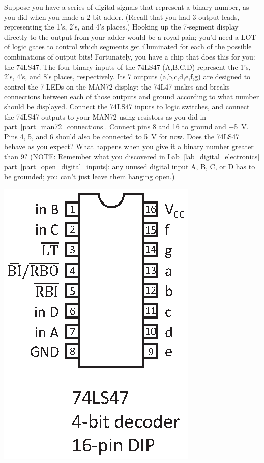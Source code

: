 \begin{enumerate}


\begin{minipage}{.70\textwidth}

\item Suppose you have a series of digital signals that represent a binary number, as you did when you made a 2-bit adder.  (Recall that you had 3 output leads, representing the 1's, 2's, and 4's places.) Hooking up the 7-segment display directly to the output from your adder would be a royal pain; you'd need a LOT of logic gates to control which segments get illuminated for each of the possible combinations of output bits!  Fortunately, you have a chip that does this for you: the 74LS47.  The four binary inputs of the 74LS47 (A,B,C,D) represent the 1's, 2's, 4's, and 8's places, respectively.  Its 7 outputs (a,b,c,d,e,f,g) are designed to control the 7 LEDs on the MAN72 display; the 74L47 makes and breaks connections between each of those outputs and ground according to what number should be displayed.  Connect the 74LS47 inputs to logic switches, and connect the 74LS47 outputs to your MAN72 using resistors as you did in part~\ref{part_man72_connections}.  Connect pins 8 and 16 to ground and +5~V.  Pins 4, 5, and 6 should also be connected to 5~V for now.   Does the 74LS47 behave as you expect?  What happens when you give it a binary number greater than 9?  (NOTE: Remember what you discovered in Lab~\ref{lab_digital_electronics} part~\ref{part_open_digital_inputs}: any unused digital input A, B, C, or D has to be grounded; you can't just leave them hanging open.)  
\end{minipage}
\begin{minipage}{.28\textwidth}
\includegraphics[scale=0.8]{appendices/pinouts/74LS47.eps}
\end{minipage}



\end{enumerate}
